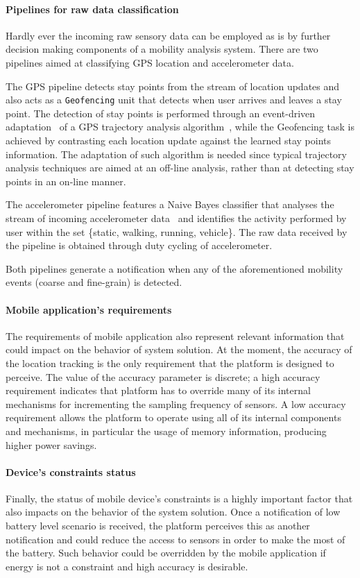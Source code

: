\documentclass[ENG,PhD]{cinvestav}
\begin{document}
\paragraph*{Pipelines for raw data classification}
Hardly ever the incoming raw sensory data can be employed as is by further decision making components of a mobility analysis system.
There are two pipelines aimed at classifying GPS location and accelerometer data. 

The GPS pipeline detects stay points from the stream of location updates and also acts as a \texttt{Geofencing} unit that detects when user arrives and leaves a stay point.
The detection of stay points is performed through an event-driven adaptation~\cite{Perez-Torres2016b} of a GPS trajectory analysis algorithm~\cite{Li2008,Ye2009}, while the Geofencing task is achieved by contrasting each location update against the learned stay points information.
The adaptation of such algorithm is needed since typical trajectory analysis techniques are aimed at an off-line analysis, rather than at detecting stay points in an on-line manner.

The accelerometer pipeline features a Naive Bayes classifier that analyses the stream of incoming accelerometer data~\cite{Torres-Huitzil2015} and identifies the activity performed by user within the set \{static, walking, running, vehicle\}.
The raw data received by the pipeline is obtained through duty cycling of accelerometer.

Both pipelines generate a notification when any of the aforementioned mobility events (coarse and fine-grain) is detected.

\paragraph*{Mobile application's requirements}
The requirements of mobile application also represent relevant information that could impact on the behavior of system solution.
At the moment, the accuracy of the location tracking is the only requirement that the platform is designed to perceive.
The value of the accuracy parameter is discrete; a high accuracy requirement indicates that platform has to override many of its internal mechanisms for incrementing the sampling frequency of sensors.
A low accuracy requirement allows the platform to operate using all of its internal components and mechanisms, in particular the usage of memory information, producing higher power savings.

\paragraph*{Device's constraints status} 
Finally, the status of mobile device's constraints is a highly important factor that also impacts on the behavior of the system solution.
Once a notification of low battery level scenario is received, the platform perceives this as another notification and could reduce the access to sensors in order to make the most of the battery.
Such behavior could be overridden by the mobile application if energy is not a constraint and high accuracy is desirable.
\end{document}
